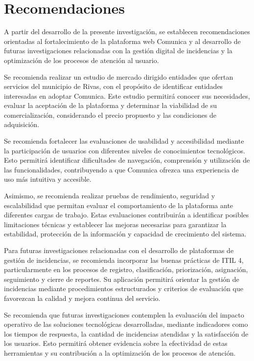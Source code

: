 \section{Recomendaciones}

A partir del desarrollo de la presente investigación, se establecen recomendaciones orientadas al fortalecimiento de la plataforma web Comunica y al desarrollo de futuras investigaciones relacionadas con la gestión digital de incidencias y la optimización de los procesos de atención al usuario.

Se recomienda realizar un estudio de mercado dirigido entidades que ofertan servicios del municipio de Rivas, con el propósito de identificar entidades interesadas en adoptar Comunica. Este estudio permitirá conocer sus necesidades, evaluar la aceptación de la plataforma y determinar la viabilidad de su comercialización, considerando el precio propuesto y las condiciones de adquisición.

Se recomienda fortalecer las evaluaciones de usabilidad y accesibilidad mediante la participación de usuarios con diferentes niveles de conocimientos tecnológicos. Esto permitirá identificar dificultades de navegación, comprensión y utilización de las funcionalidades, contribuyendo a que Comunica ofrezca una experiencia de uso más intuitiva y accesible.

Asimismo, se recomienda realizar pruebas de rendimiento, seguridad y escalabilidad que permitan evaluar el comportamiento de la plataforma ante diferentes cargas de trabajo. Estas evaluaciones contribuirán a identificar posibles limitaciones técnicas y establecer las mejoras necesarias para garantizar la estabilidad, protección de la información y capacidad de crecimiento del sistema.

Para futuras investigaciones relacionadas con el desarrollo de plataformas de gestión de incidencias, se recomienda incorporar las buenas prácticas de ITIL 4, particularmente en los procesos de registro, clasificación, priorización, asignación, seguimiento y cierre de reportes. Su aplicación permitirá orientar la gestión de incidencias mediante procedimientos estructurados y criterios de evaluación que favorezcan la calidad y mejora continua del servicio.

Se recomienda que futuras investigaciones contemplen la evaluación del impacto operativo de las soluciones tecnológicas desarrolladas, mediante indicadores como los tiempos de respuesta, la cantidad de incidencias atendidas y la satisfacción de los usuarios. Esto permitirá obtener evidencia sobre la efectividad de estas herramientas y su contribución a la optimización de los procesos de atención.

